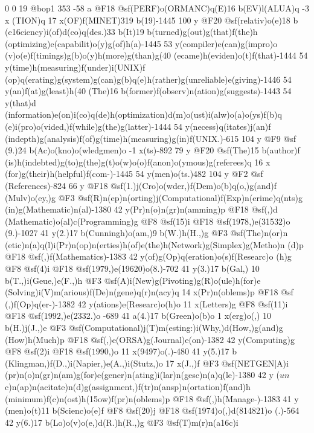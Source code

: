 {{{{{{{{{{{{{{{{{{{{{{{{{{{{{{{{{{{{{{{{{{{{{{{{{{{{{{{{{{{{{{{{{{{{{{{{{{{{{{{{{{{{{{{{{{{{{{{{{{{{{0 0 19 @bop1 353 -58 a @F18 @sf(PERF)o(ORMANC)q(E)16 b(EV)l(ALUA)q -3 x
(TION)q 17 x(OF)f(MINET)319 b(19)-1445 100 y @F20 @sf(relativ)o(e)18 b
(e\016ciency)i(of)d(co)q(des.)33 b(It)19 b(turned)g(out)g(that)f(the)h
(optimizing)e(capabilit)o(y)g(of)h(a)-1445 53 y(compiler)e(can)g(impro)o
(v)o(e)f(timings)g(b)o(y)h(more)g(than)g(40%
(ecame)h(eviden)o(t)f(that)-1444 54 y(time)h(measuring)f(under)i(UNIX)f
(op)q(erating)g(system)g(can)g(b)q(e)h(rather)g(unreliable)e(giving)-1446 
54 y(an)f(at)g(least)h(40%
(The)16 b(former)f(observ)n(ation)g(suggests)-1443 54 y(that)d
(information)e(on)i(co)q(de)h(optimization)d(m)o(ust)i(alw)o(a)o(ys)f(b)q
(e)i(pro)o(vided,)f(while)g(the)g(latter)-1444 54 y(necess)q(itates)j(an)f
(in{depth)g(analysis)f(of)g(time)h(measuring)g(in)f(UNIX.)-615 104 y @F9 @sf
(9.)24 b(Ac)o(kno)o(wledgmen)o -1 x(ts)-892 79 y @F20 @sf(The)15 b(author)f
(is)h(indebted)g(to)g(the)g(t)o(w)o(o)f(anon)o(ymous)g(referees)q 16 x
(for)g(their)h(helpful)f(com-)-1445 54 y(men)o(ts.)482 104 y @F2 @sf
(References)-824 66 y @F18 @sf(1.)j(Cro)o(wder,)f(Dem)o(b)q(o,)g(and)f
(Mulv)o(ey,)g @F3 @sf(R)n(ep)n(orting)j(Computational)f(Exp)n(erime)q(nts)g
(in)g(Mathematic)n(al)-1380 42 y(Pr)n(o)n(gr)n(amming)p @F18 @sf(,)d
(Mathematic)o(al)c(Programming)g @F8 @sf(15)i @F18 @sf(\(1978\),)e(315{32)o
(9.)-1027 41 y(2.)17 b(Cunningh)o(am,)9 b(W.)h(H.,)g @F3 @sf(The)n(or)n
(etic)n(a)q(l)i(Pr)n(op)n(erties)h(of)e(the)h(Network)g(Simplex)g(Metho)n
(d)p @F18 @sf(,)f(Mathematics)-1383 42 y(of)g(Op)q(eration)o(s)f(Researc)o
(h)g @F8 @sf(4)i @F18 @sf(\(1979\),)e(196{20)o(8.)-702 41 y(3.)17 b(Gal,)
10 b(T.,)i(Geue,)e(F.,)h @F3 @sf(A)i(New)g(Pivoting)g(R)o(ule)h(for)e
(Solving)i(V)m(arious)f(De)n(gene)q(r)n(acy)q 14 x(Pr)n(oblems)p @F18 @sf
(,)f(Op)q(er-)-1382 42 y(ations)e(Researc)o(h)o 11 x(Letters)g @F8 @sf(11)i 
@F18 @sf(\(1992\),)e(23{32.)o -689 41 a(4.)17 b(Green)o(b)o 1 x(erg)o(,)
10 b(H.)j(J.,)e @F3 @sf(Computational)j(T)m(esting:)i(Why,)d(How,)g(and)g
(How)h(Much)p @F18 @sf(,)e(ORSA)g(Journal)e(on)-1382 42 y(Computing)g 
@F8 @sf(2)i @F18 @sf(\(1990\),)o 11 x(94{97)o(.)-480 41 y(5.)17 b
(Klingman,)f(D.,)i(Napier,)e(A.,)i(Stutz,)o 17 x(J.,)f @F3 @sf(NETGEN|A)i
(pr)n(o)n(gr)n(am)g(for)e(gener)n(ating)i(lar)n(ge{sc)n(a)q(le)-1380 42 y
(\(un\)c)n(ap)n(acitate)n(d)g(assignment,)f(tr)n(ansp)n(ortation)f(and)h
(minimum)f(c)n(ost)h(\015ow)f(pr)n(oblems)p @F18 @sf(,)h(Manage-)-1383 41 y
(men)o(t)11 b(Scienc)o(e)f @F8 @sf(20)j @F18 @sf(\(1974\))o(,)d(814{821)o
(.)-564 42 y(6.)17 b(Lo)o(v)o(e,)d(R.)h(R.,)g @F3 @sf(T)m(r)n(a\016c)i
}}}}}}}}}}}}}}}}}}}}}}}}}}}}}}}}}}}}}}}}}}}}}}}}}}}}}}}}}}}}}}}}}}}}}}}}}}}}}}}}}}}}}}}}}}}}}}}}}}}}}}}}}}}}
